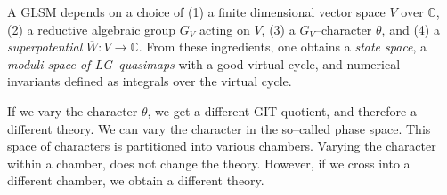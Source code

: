 \documentclass[10pt, letterpaper]{amsart}
\theoremstyle{remark}
\newcommand{\CC}{\mathbb C}
\newcommand{\cX}{\mathcal{X}}
\newcommand{\git}{\mathbin{
  \mathchoice{/\mkern-6mu/}%
    {/\mkern-6mu/}%
    {/\mkern-5mu/}%
    {/\mkern-5mu/}}}
\DeclareMathOperator{\GL}{GL}
\newcommand{\nathanin}[1]{\todo[bordercolor=pistachio,backgroundcolor=eggshell, author=N, inline]{#1}}
\begin{document}
A GLSM depends on a choice of (1) a finite dimensional vector space $V$ over $\CC$, (2) a reductive algebraic group $G_V$ acting on $V$, (3) a $G_V$--character $\theta$, and (4) a \emph{superpotential} $\overline W: V\to \CC$. From these ingredients, one obtains a \emph{state space}, a \emph{moduli space of LG--quasimaps} with a good virtual cycle, and numerical invariants defined as integrals over the virtual cycle.


If we vary the character $\theta$, we get a different GIT quotient, and therefore a different theory. We can vary the character in the so--called phase space. This space of characters is partitioned into various chambers. Varying the character within a chamber, does not change the theory. However, if we cross into a different chamber, we obtain a different theory. 
\end{document}
